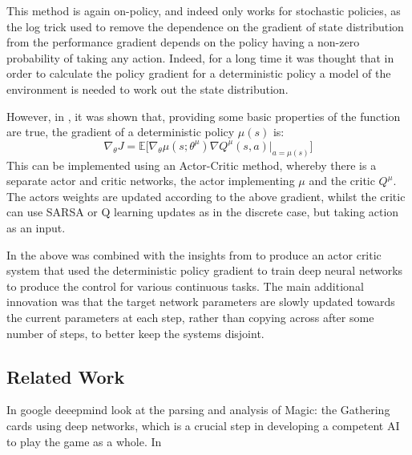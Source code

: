 This method is again on-policy, and indeed only works for stochastic policies, as the log trick used to remove the dependence on the gradient of state distribution from the performance gradient depends on the policy having a non-zero probability of taking any action. Indeed, for a long time it was thought that in order to calculate the policy gradient for a deterministic policy a model of the environment is needed to work out the state distribution.

However, in \cite{detpolgrad}, it was shown that, providing some basic properties of the function are true, the gradient of a deterministic policy $\mu(s)$ is:
\begin{equation}
\nabla_\theta J =\mathbb{E}\big[ \nabla_\theta  \mu ( s ; \theta^\mu) \nabla Q^\mu (s,a)|_{a = \mu(s)}\big]
\end{equation}
This can be implemented using an Actor-Critic method, whereby there is a separate actor and critic networks, the actor implementing $\mu$ and the critic $Q^\mu$. The actors weights are updated according to the above gradient, whilst the critic can use SARSA or Q learning updates as in the discrete case, but taking action as an input.

In \cite{detcontcont} the above was combined with the insights from \cite{deepmindatari} to produce an actor critic system that used the deterministic policy gradient to train deep neural networks to produce the control for various continuous tasks. The main additional innovation was that the target network parameters are slowly updated towards the current parameters at each step, rather than copying across after some number of steps, to better keep the systems disjoint.

\subsection{Related Work}
In \cite{deepmindMtg} google deeepmind look at the parsing and analysis of Magic: the Gathering cards using deep networks, which is a crucial step in developing a competent AI to play the game as a whole.
In \cite{Reinforcement-like-parameter} %


